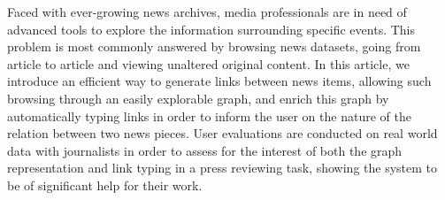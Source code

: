Faced with ever-growing news archives, media professionals are in need of advanced tools to explore the information surrounding specific events. This problem is most commonly answered by browsing news datasets, going from article to article and viewing unaltered original content. In this article, we introduce an efficient way to generate links between news items, allowing such browsing through an easily explorable graph, and enrich this graph by automatically typing links in order to inform the user on the nature of the relation between two news pieces. User evaluations are conducted on real world data with journalists in order to assess for the interest of both the graph representation and link typing in a press reviewing task, showing the system to be of significant help for their work.

